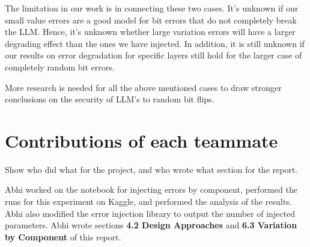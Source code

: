 The limitation in our work is in connecting these two cases. It's unknown if our small value errors are a good model for bit errors that do not completely break the LLM. Hence, it's unknown whether
large variation errors will have a larger degrading effect than the ones we have injected. In addition, it is still unknown if our results on error degradation for specific layers still hold for
the larger case of completely random bit errors.

More research is needed for all the above mentioned cases to draw stronger conclusions on the security of LLM's to random bit flips.

\section{Contributions of each teammate}
Show who did what for the project, and who wrote what section for the report. 

Abhi worked on the notebook for injecting errors by component, performed the runs for this experiment on Kaggle, and performed the analysis of the results. Abhi also modified the error injection library to output the number of injected parameters. Abhi wrote sections \textbf{4.2 Design Approaches} and \textbf{6.3 Variation by Component} of this report.



